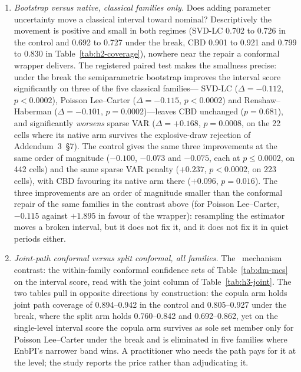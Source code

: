 \begin{enumerate}
  ($p = 0.739$) and the NB head ($p = 0.139$) are indistinguishable. All
  four signs are the same in the control, on 434--442 common cells rather
  than 38--40 (LSTM $+0.156$, $p=0.005$; neural-LC $-1.142$, $p=0.0002$;
  NB head $+0.049$, $p=0.019$; CNN-LC $+0.001$, $p=0.991$), so the
  opposing directions are a property of the family, not of the break. The
  mechanism is not separable from the architecture it wraps: no single
  ordering of the two survives a change of family, which is the crossed
  design's reason for existing.
\item \emph{Bootstrap versus native, classical families only.} Does adding
  parameter uncertainty move a classical interval toward nominal?
  Descriptively the movement is positive and small in both regimes
  (SVD-LC 0.702 to 0.726 in the control and 0.692 to 0.727 under the
  break, CBD 0.901 to 0.921 and 0.799 to 0.830 in
  Table~\ref{tab:h2-coverage}), nowhere near the repair a conformal
  wrapper delivers. The registered paired test makes the smallness
  precise: under the break the semiparametric bootstrap improves the
  interval score significantly on three of the five classical families---
  SVD-LC ($\Delta = -0.112$, $p < 0.0002$), Poisson Lee--Carter
  ($\Delta = -0.115$, $p < 0.0002$) and Renshaw--Haberman
  ($\Delta = -0.101$, $p = 0.0002$)---leaves CBD unchanged ($p = 0.681$),
  and significantly \emph{worsens} sparse VAR ($\Delta = +0.168$,
  $p = 0.0008$, on the 22 cells where its native arm survives the
  explosive-draw rejection of Addendum~3~\S7). The control gives the same
  three improvements at the same order of magnitude ($-0.100$, $-0.073$
  and $-0.075$, each at $p \le 0.0002$, on 442 cells) and the same sparse
  VAR penalty ($+0.237$, $p < 0.0002$, on 223 cells), with CBD favouring
  its native arm there ($+0.096$, $p = 0.016$). The three improvements are
  an order of magnitude smaller than the conformal repair of the same
  families in the contrast above (for Poisson Lee--Carter, $-0.115$ against
  $+1.895$ in favour of the wrapper): resampling the estimator moves a
  broken interval, but it does not fix it, and it does not fix it in quiet
  periods either.
\item \emph{Joint-path conformal versus split conformal, all families.} The
  \Hthree\ mechanism contrast: the within-family conformal confidence sets
  of Table~\ref{tab:dm-mcs} on the interval score, read with the joint
  column of Table~\ref{tab:h3-joint}. The two tables pull in opposite
  directions by construction: the copula arm holds joint path coverage of
  0.894--0.942 in the control and 0.805--0.927 under the break, where the
  split arm holds 0.760--0.842 and 0.692--0.862, yet on the single-level
  interval score the copula arm survives as sole set member only for
  Poisson Lee--Carter under the break and is eliminated in five families
  where EnbPI's narrower band wins. A practitioner who needs the path pays
  for it at the level; the study reports the price rather than
  adjudicating it.
\end{enumerate}
